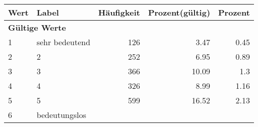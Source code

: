      \begin{longtable}{lXrrr}
     \toprule
     \textbf{Wert} & \textbf{Label} & \textbf{Häufigkeit} & \textbf{Prozent(gültig)} & \textbf{Prozent} \\
     \endhead
     \midrule
     \multicolumn{5}{l}{\textbf{Gültige Werte}}\\

     1 &
     \multicolumn{1}{X}{ sehr bedeutend   } &


       \num{126} &
       \num[round-mode=places,round-precision=2]{3.47} &
         \num[round-mode=places,round-precision=2]{0.45} \\

     2 &
     \multicolumn{1}{X}{ 2   } &


       \num{252} &
       \num[round-mode=places,round-precision=2]{6.95} &
         \num[round-mode=places,round-precision=2]{0.89} \\

     3 &
     \multicolumn{1}{X}{ 3   } &


       \num{366} &
       \num[round-mode=places,round-precision=2]{10.09} &
         \num[round-mode=places,round-precision=2]{1.3} \\

     4 &
     \multicolumn{1}{X}{ 4   } &


       \num{326} &
       \num[round-mode=places,round-precision=2]{8.99} &
         \num[round-mode=places,round-precision=2]{1.16} \\

     5 &
     \multicolumn{1}{X}{ 5   } &


       \num{599} &
       \num[round-mode=places,round-precision=2]{16.52} &
         \num[round-mode=places,round-precision=2]{2.13} \\

     6 &
     \multicolumn{1}{X}{ bedeutungslos   } &



\end{longtable}
